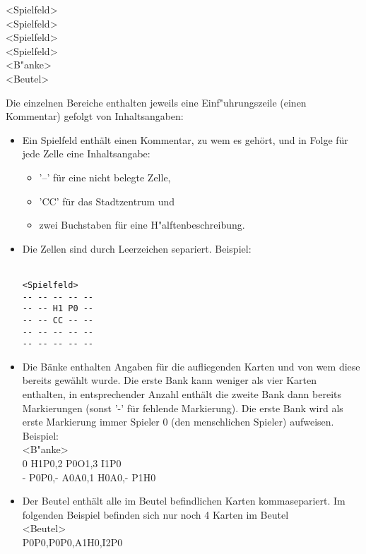 \begin{addmargin}[50pt]{0pt}
\begin{samepage}
<Spielfeld>
\\<Spielfeld>
\\<Spielfeld>
\\<Spielfeld>
\\<B"anke>
\\<Beutel>\\
\end{samepage}
\end{addmargin}

Die einzelnen Bereiche enthalten jeweils eine Einf"uhrungszeile (einen Kommentar) gefolgt von Inhaltsangaben:
\begin{itemize}
	\item Ein Spielfeld enthält einen Kommentar, zu wem es gehört, und in Folge für jede Zelle eine Inhaltsangabe:
	\begin{itemize}
		\item '--' für eine nicht belegte Zelle,
		\item 'CC' für das Stadtzentrum und
		\item zwei Buchstaben für eine H"alftenbeschreibung.
	\end{itemize}
	\item Die Zellen sind durch Leerzeichen separiert. Beispiel:
	\begin{samepage}
	\\ \verb|<Spielfeld>|
	\\ \verb|-- -- -- -- --|
	\\ \verb|-- -- H1 P0 --|
	\\ \verb|-- -- CC -- --|
	\\ \verb|-- -- -- -- --|
	\\ \verb|-- -- -- -- --|
	\end{samepage}
	\item Die Bänke enthalten Angaben für die aufliegenden Karten und von wem diese bereits gewählt wurde. Die erste Bank kann weniger als vier Karten enthalten, in entsprechender Anzahl enthält die zweite Bank dann bereits Markierungen (sonst '-' für fehlende Markierung). Die erste Bank wird als erste Markierung immer Spieler 0 (den menschlichen Spieler) aufweisen. Beispiel:
	\\<B"anke>
  \\0 H1P0,2 P0O1,3 I1P0
  \\- P0P0,- A0A0,1 H0A0,- P1H0
  \item Der Beutel enthält alle im Beutel befindlichen Karten kommasepariert. Im folgenden Beispiel befinden sich nur noch 4 Karten im Beutel
  \\<Beutel>
  \\P0P0,P0P0,A1H0,I2P0
\end{itemize}

